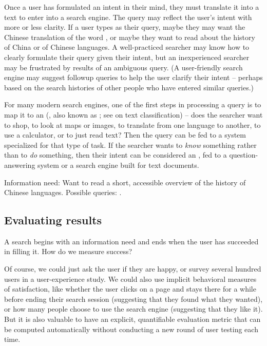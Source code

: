 Once a user has formulated an intent in their mind, they must translate it into a text  to enter into a search engine.  The query may reflect the user's intent with more or less clarity.  If a user types  as their query, maybe they may want the Chinese translation of the word , or maybe they want to read about the history of China or of  Chinese languages.  A well-practiced searcher may know how to clearly formulate their query given their intent, but an inexperienced searcher may be frustrated by results of an ambiguous query.  (A user-friendly search engine may suggest followup queries to help the user clarify their intent -- perhaps based on the search histories of other people who have entered similar queries.)

For many modern search engines, one of the first steps in processing a query is to map it to an  (, also known as ; see  on text classification) -- does the searcher want to shop, to look at maps or images, to translate from one language to another, to use a calculator, or to just read text?  Then the query can be fed to a system specialized for that type of task.  If the searcher wants to \emph{know} something rather than to \emph{do} something, then their intent can be considered an ,  fed to a question-answering system or a search engine built for text documents.


\ea   \ea \label{ex:chinese-history} Information need:    Want to read a short, accessible overview of the history of  Chinese languages.
      \ex Possible queries: 
      .
      \z
      \z 




\subsection{Evaluating results} \label{sec:evaluating-search-results}

A search begins with an information need and ends when the user has succeeded in filling it.  How do we measure success?

Of course, we could just ask the user if they are happy, or survey several hundred users in a user-experience study.  We could also use implicit behavioral measures of satisfaction, like whether the user clicks on a page and stays there for a while before ending their search session (suggesting that they found what they wanted), or how many people choose to use the search engine (suggesting that they like it).    But it is also valuable to have an explicit, quantifiable evaluation metric that can be computed automatically without conducting a new round of user testing each time.

